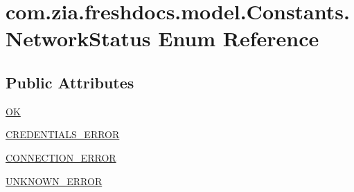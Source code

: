 \hypertarget{enumcom_1_1zia_1_1freshdocs_1_1model_1_1_constants_1_1_network_status}{\section{com.\-zia.\-freshdocs.\-model.\-Constants.\-Network\-Status Enum Reference}
\label{enumcom_1_1zia_1_1freshdocs_1_1model_1_1_constants_1_1_network_status}
}
\subsection*{Public Attributes}
\begin{DoxyCompactItemize}
\item 
\hyperlink{enumcom_1_1zia_1_1freshdocs_1_1model_1_1_constants_1_1_network_status_af8a8316702290b23fe496a428e710add}{O\-K}
\item 
\hyperlink{enumcom_1_1zia_1_1freshdocs_1_1model_1_1_constants_1_1_network_status_a357012e177510fb075d1b88baa1ad942}{C\-R\-E\-D\-E\-N\-T\-I\-A\-L\-S\-\_\-\-E\-R\-R\-O\-R}
\item 
\hyperlink{enumcom_1_1zia_1_1freshdocs_1_1model_1_1_constants_1_1_network_status_a39350e2112f64f7d21b9cad24f4b2d35}{C\-O\-N\-N\-E\-C\-T\-I\-O\-N\-\_\-\-E\-R\-R\-O\-R}
\item 
\hyperlink{enumcom_1_1zia_1_1freshdocs_1_1model_1_1_constants_1_1_network_status_a6beb7c40289fe14978d18e7cbc869af4}{U\-N\-K\-N\-O\-W\-N\-\_\-\-E\-R\-R\-O\-R}
\end{DoxyCompactItemize}



